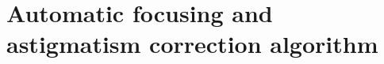 \documentclass[12pt, conference]{IEEEtran}
\begin{document}





\section{Automatic focusing and astigmatism correction algorithm}
\label{Section correction algorithm}
\end{document}
